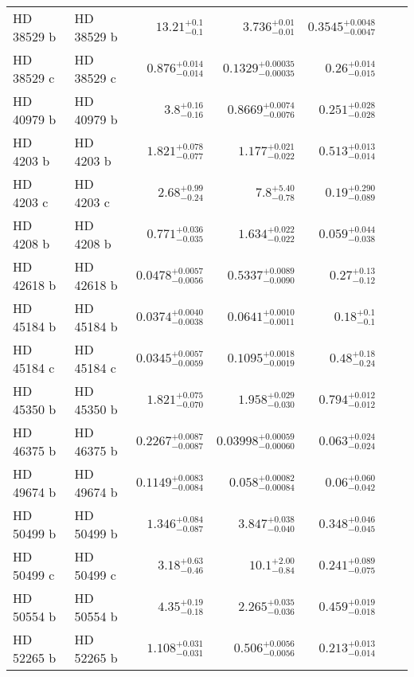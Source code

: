 \begin{longtable*}{llrrrrr}
HD 38529 b & HD 38529 b & $13.21^{+0.1}_{-0.1}$ & $3.736^{+0.01}_{-0.01}$ & $0.3545^{+0.0048}_{-0.0047}$ & \cite{Fischer01} & \\ 
HD 38529 c & HD 38529 c & $0.876^{+0.014}_{-0.014}$ & $0.1329^{+0.00035}_{-0.00035}$ & $0.26^{+0.014}_{-0.015}$ & \cite{Butler06} & \\ 
HD 40979 b & HD 40979 b & $3.8^{+0.16}_{-0.16}$ & $0.8669^{+0.0074}_{-0.0076}$ & $0.251^{+0.028}_{-0.028}$ & \cite{Butler06} & \\ 
HD 4203 b & HD 4203 b & $1.821^{+0.078}_{-0.077}$ & $1.177^{+0.021}_{-0.022}$ & $0.513^{+0.013}_{-0.014}$ & \cite{Vogt02} & \\ 
HD 4203 c & HD 4203 c & $2.68^{+0.99}_{-0.24}$ & $7.8^{+5.40}_{-0.78}$ & $0.19^{+0.290}_{-0.089}$ & \cite{Kane14} & \\ 
HD 4208 b & HD 4208 b & $0.771^{+0.036}_{-0.035}$ & $1.634^{+0.022}_{-0.022}$ & $0.059^{+0.044}_{-0.038}$ & \cite{Vogt02} & \\ 
HD 42618 b & HD 42618 b & $0.0478^{+0.0057}_{-0.0056}$ & $0.5337^{+0.0089}_{-0.0090}$ & $0.27^{+0.13}_{-0.12}$ & \cite{Fulton16} & \\ 
HD 45184 b & HD 45184 b & $0.0374^{+0.0040}_{-0.0038}$ & $0.0641^{+0.0010}_{-0.0011}$ & $0.18^{+0.1}_{-0.1}$ & \cite{Udry19} & \\ 
HD 45184 c & HD 45184 c & $0.0345^{+0.0057}_{-0.0059}$ & $0.1095^{+0.0018}_{-0.0019}$ & $0.48^{+0.18}_{-0.24}$ & \cite{Udry19} & \\ 
HD 45350 b & HD 45350 b & $1.821^{+0.075}_{-0.070}$ & $1.958^{+0.029}_{-0.030}$ & $0.794^{+0.012}_{-0.012}$ & \cite{Marcy05} & \\ 
HD 46375 b & HD 46375 b & $0.2267^{+0.0087}_{-0.0087}$ & $0.03998^{+0.00059}_{-0.00060}$ & $0.063^{+0.024}_{-0.024}$ & \cite{Marcy00} & \\ 
HD 49674 b & HD 49674 b & $0.1149^{+0.0083}_{-0.0084}$ & $0.058^{+0.00082}_{-0.00084}$ & $0.06^{+0.060}_{-0.042}$ & \cite{Butler03} & \\ 
HD 50499 b & HD 50499 b & $1.346^{+0.084}_{-0.087}$ & $3.847^{+0.038}_{-0.040}$ & $0.348^{+0.046}_{-0.045}$ & \cite{Vogt05} & \\ 
HD 50499 c & HD 50499 c & $3.18^{+0.63}_{-0.46}$ & $10.1^{+2.00}_{-0.84}$ & $0.241^{+0.089}_{-0.075}$ & \cite{Rickman19} & \\ 
HD 50554 b & HD 50554 b & $4.35^{+0.19}_{-0.18}$ & $2.265^{+0.035}_{-0.036}$ & $0.459^{+0.019}_{-0.018}$ & \cite{Fischer02} & \\ 
HD 52265 b & HD 52265 b & $1.108^{+0.031}_{-0.031}$ & $0.506^{+0.0056}_{-0.0056}$ & $0.213^{+0.013}_{-0.014}$ & \cite{Butler00} & \\ 

\end{longtable*}
